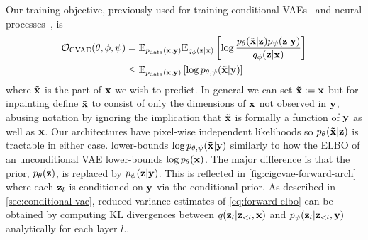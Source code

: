 Our training objective, previously used for training conditional
VAEs~\citep{sohn2015learning,ivanov2018variational} and neural
processes~\citep{garnelo2018neural}, is
\begin{align}
  \label{eq:forward-elbo}
  {\mathcal{O}}_\text{CVAE}(\theta, \phi, \psi) &= \mathbb{E}_{p_{\rm{data}}({\mathbf{x}}, {\mathbf{y}})} \mathbb{E}_{q_\phi({\mathbf{z}}|{\mathbf{x}})} \left[ \log \frac{p_\theta(\mathbf{\tilde{x}}|{\mathbf{z}})p_\psi({\mathbf{z}}|{\mathbf{y}})}{q_\phi({\mathbf{z}}|{\mathbf{x}})} \right] \\
  &\leq \mathbb{E}_{p_{\rm{data}}({\mathbf{x}}, {\mathbf{y}})} \left[ \log p_{\theta,\psi}(\mathbf{\tilde{x}}{}|{\mathbf{y}}) \right]
\end{align}
where $\tilde{{\mathbf{x}}}$ is the part of ${\mathbf{x}}$ we wish to predict. In general we can
set $\mathbf{\tilde{x}}{}:={\mathbf{x}}$ but for inpainting define $\mathbf{\tilde{x}}{}$ to consist of only
the dimensions of ${\mathbf{x}}$ not observed in ${\mathbf{y}}$, abusing notation by
ignoring the implication that $\mathbf{\tilde{x}}{}$ is formally a function of ${\mathbf{y}}$
as well as ${\mathbf{x}}$. Our architectures have pixel-wise independent
likelihoods so $p_\theta(\mathbf{\tilde{x}}{}|{\mathbf{z}})$ is tractable in either case. 
lower-bounds $\log p_{\theta,\psi}(\mathbf{\tilde{x}}{}|{\mathbf{y}}) $ similarly to how the ELBO of
an unconditional VAE lower-bounds $\log p_\theta({\mathbf{x}})$. The major difference
is that the prior, $p_\theta({\mathbf{z}})$, is replaced by $p_\psi({\mathbf{z}}|{\mathbf{y}})$.
This is reflected in \cref{fig:cigcvae-forward-arch} where each ${\mathbf{z}}_l$ is conditioned
on ${\mathbf{y}}$ via the conditional prior.
%
As described in \cref{sec:conditional-vae},
reduced-variance estimates of \cref{eq:forward-elbo} can be obtained by
computing KL divergences between $q({\mathbf{z}}_l|{\mathbf{z}}_{<l},{\mathbf{x}})$ and
$p_\psi({\mathbf{z}}_l|{\mathbf{z}}_{<l},{\mathbf{y}})$ analytically for each layer $l$..

